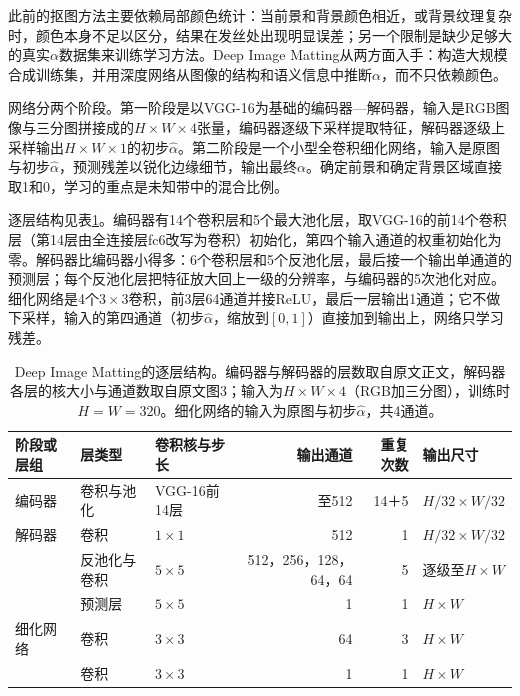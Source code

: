 此前的抠图方法主要依赖局部颜色统计：当前景和背景颜色相近，或背景纹理复杂时，颜色本身不足以区分，结果在发丝处出现明显误差；另一个限制是缺少足够大的真实$\alpha$数据集来训练学习方法。Deep Image Matting从两方面入手：构造大规模合成训练集，并用深度网络从图像的结构和语义信息中推断$\alpha$，而不只依赖颜色。

网络分两个阶段。第一阶段是以VGG-16为基础的编码器—解码器，输入是RGB图像与三分图拼接成的$H\times W\times4$张量，编码器逐级下采样提取特征，解码器逐级上采样输出$H\times W\times1$的初步$\hat\alpha$。第二阶段是一个小型全卷积细化网络，输入是原图与初步$\hat\alpha$，预测残差以锐化边缘细节，输出最终$\alpha$。确定前景和确定背景区域直接取1和0，学习的重点是未知带中的混合比例。

逐层结构见表\ref{tab:vision-recognition-matting-layers}。编码器有14个卷积层和5个最大池化层，取VGG-16的前14个卷积层（第14层由全连接层fc6改写为卷积）初始化，第四个输入通道的权重初始化为零。解码器比编码器小得多：6个卷积层和5个反池化层，最后接一个输出单通道的预测层；每个反池化层把特征放大回上一级的分辨率，与编码器的5次池化对应。细化网络是4个$3\times3$卷积，前3层64通道并接ReLU，最后一层输出1通道；它不做下采样，输入的第四通道（初步$\hat\alpha$，缩放到$[0,1]$）直接加到输出上，网络只学习残差。

\begin{table}[tbp]
 \centering
 \small
 \begin{tabular}{@{}lllrrl@{}}
 \toprule
 阶段或层组 & 层类型 & 卷积核与步长 & 输出通道 & 重复次数 & 输出尺寸\\
 \midrule
 编码器 & 卷积与池化 & VGG-16前14层 & 至512 & 14＋5 & $H/32\times W/32$\\
 解码器 & 卷积 & $1\times1$ & 512 & 1 & $H/32\times W/32$\\
        & 反池化与卷积 & $5\times5$ & 512，256，128，64，64 & 5 & 逐级至$H\times W$\\
        & 预测层 & $5\times5$ & 1 & 1 & $H\times W$\\
 细化网络 & 卷积 & $3\times3$ & 64 & 3 & $H\times W$\\
          & 卷积 & $3\times3$ & 1 & 1 & $H\times W$\\
 \bottomrule
 \end{tabular}
 \caption{Deep Image Matting的逐层结构。编码器与解码器的层数取自原文正文，解码器各层的核大小与通道数取自原文图3；输入为$H\times W\times4$（RGB加三分图），训练时$H=W=320$。细化网络的输入为原图与初步$\hat\alpha$，共4通道。}
 \label{tab:vision-recognition-matting-layers}
\end{table}

